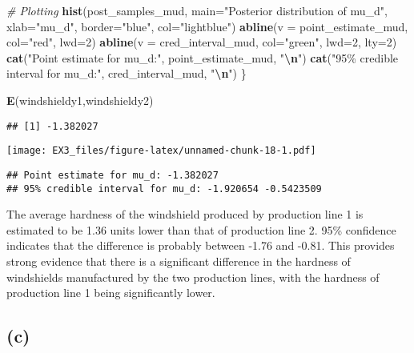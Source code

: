 \documentclass[
]{article}
\newenvironment{Shaded}{\begin{snugshade}}{\end{snugshade}}
\newcommand{\AttributeTok}[1]{\textcolor[rgb]{0.13,0.29,0.53}{#1}}
\newcommand{\CommentTok}[1]{\textcolor[rgb]{0.56,0.35,0.01}{\textit{#1}}}
\newcommand{\DecValTok}[1]{\textcolor[rgb]{0.00,0.00,0.81}{#1}}
\newcommand{\FunctionTok}[1]{\textcolor[rgb]{0.13,0.29,0.53}{\textbf{#1}}}
\newcommand{\NormalTok}[1]{#1}
\newcommand{\SpecialCharTok}[1]{\textcolor[rgb]{0.81,0.36,0.00}{\textbf{#1}}}
\newcommand{\StringTok}[1]{\textcolor[rgb]{0.31,0.60,0.02}{#1}}
\begin{document}
\begin{Shaded}
\begin{Highlighting}[]
     \CommentTok{\# Plotting}
     \FunctionTok{hist}\NormalTok{(post\_samples\_mud, }\AttributeTok{main=}\StringTok{"Posterior distribution of mu\_d"}\NormalTok{, }\AttributeTok{xlab=}\StringTok{"mu\_d"}\NormalTok{, }\AttributeTok{border=}\StringTok{"blue"}\NormalTok{, }\AttributeTok{col=}\StringTok{"lightblue"}\NormalTok{)}
     \FunctionTok{abline}\NormalTok{(}\AttributeTok{v =}\NormalTok{ point\_estimate\_mud, }\AttributeTok{col=}\StringTok{"red"}\NormalTok{, }\AttributeTok{lwd=}\DecValTok{2}\NormalTok{)}
     \FunctionTok{abline}\NormalTok{(}\AttributeTok{v =}\NormalTok{ cred\_interval\_mud, }\AttributeTok{col=}\StringTok{"green"}\NormalTok{, }\AttributeTok{lwd=}\DecValTok{2}\NormalTok{, }\AttributeTok{lty=}\DecValTok{2}\NormalTok{)}
     \FunctionTok{cat}\NormalTok{(}\StringTok{"Point estimate for mu\_d:"}\NormalTok{, point\_estimate\_mud, }\StringTok{"}\SpecialCharTok{\textbackslash{}n}\StringTok{"}\NormalTok{)}
     \FunctionTok{cat}\NormalTok{(}\StringTok{"95\% credible interval for mu\_d:"}\NormalTok{, cred\_interval\_mud, }\StringTok{"}\SpecialCharTok{\textbackslash{}n}\StringTok{"}\NormalTok{)}
\NormalTok{\}}

\FunctionTok{E}\NormalTok{(windshieldy1,windshieldy2)}
\end{Highlighting}
\end{Shaded}

\begin{verbatim}
## [1] -1.382027
\end{verbatim}

\texttt{[image: EX3\_files/figure-latex/unnamed-chunk-18-1.pdf]}

\begin{verbatim}
## Point estimate for mu_d: -1.382027 
## 95% credible interval for mu_d: -1.920654 -0.5423509
\end{verbatim}

The average hardness of the windshield produced by production line 1 is
estimated to be 1.36 units lower than that of production line 2. 95\%
confidence indicates that the difference is probably between -1.76 and
-0.81. This provides strong evidence that there is a significant
difference in the hardness of windshields manufactured by the two
production lines, with the hardness of production line 1 being
significantly lower.

\hypertarget{c-2}{%
\subsection{(c)}\label{c-2}}
\end{document}
